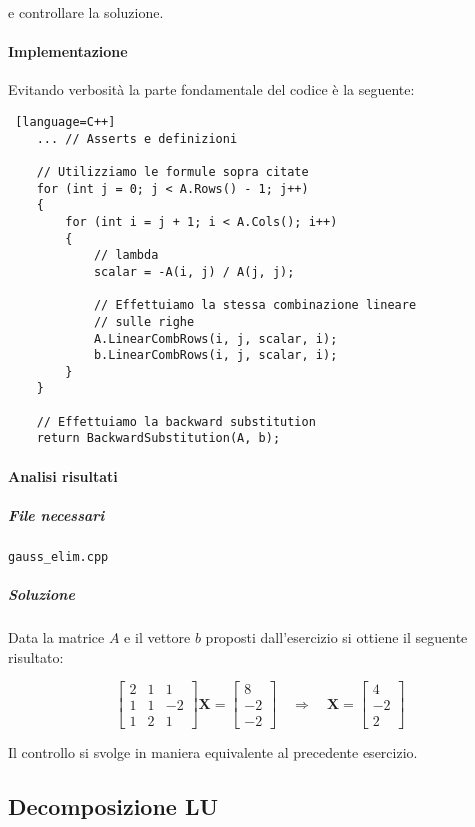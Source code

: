e controllare la soluzione.

\paragraph{Implementazione}

Evitando verbosità la parte fondamentale del codice è la seguente:

\begin{lstlisting} [language=C++]
    ... // Asserts e definizioni

    // Utilizziamo le formule sopra citate
    for (int j = 0; j < A.Rows() - 1; j++)
    {
        for (int i = j + 1; i < A.Cols(); i++)
        {
            // lambda
            scalar = -A(i, j) / A(j, j);

            // Effettuiamo la stessa combinazione lineare 
            // sulle righe 
            A.LinearCombRows(i, j, scalar, i);
            b.LinearCombRows(i, j, scalar, i);
        }
    }

    // Effettuiamo la backward substitution
    return BackwardSubstitution(A, b);
\end{lstlisting}

\paragraph{Analisi risultati}

\subparagraph{File necessari} \texttt{gauss\_elim.cpp}

\subparagraph{Soluzione} Data la matrice $A$ e il vettore $b$ proposti dall'esercizio si ottiene il seguente risultato:

$$
	\begin{bmatrix}
		2 & 1 & 1  \\
		1 & 1 & -2 \\
		1 & 2 & 1
	\end{bmatrix} \mathbf{X} = \begin{bmatrix}
		8 \\ -2 \\ -2 \end{bmatrix}
	\quad \Rightarrow \quad \mathbf{X} = \begin{bmatrix} 4 \\ -2 \\ 2 \end{bmatrix}
$$

Il controllo si svolge in maniera equivalente al precedente esercizio.

\subsection{Decomposizione LU}

